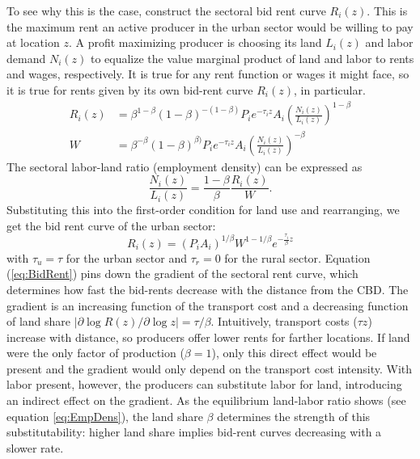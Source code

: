 \documentclass[12pt]{article}
\begin{document}
To see why this is the case, construct the sectoral bid rent curve $R_i(z)$. This is the maximum rent an active producer in the urban sector would be willing to pay at location $z$. %
A profit maximizing producer is choosing its land $L_i(z)$ and labor demand $N_i(z)$ to equalize the value marginal product of land and labor to rents and wages, respectively. It is true for any rent function or wages it might face, so it is true for rents given by its own bid-rent curve $R_i(z)$, in particular.
\begin{align}
R_i(z) &=\beta^{1-\beta}(1-\beta)^{-(1-\beta)} P_ie^{-\tau_i z}A_i \left(\frac{N_i(z)}{L_i(z)}\right)^{1-\beta}\\
W &=\beta^{-\beta}(1-\beta)^{\beta)} P_ie^{-\tau_i z}A_i \left(\frac{N_i(z)}{L_i(z)}\right)^{-\beta}
\end{align}
The sectoral labor-land ratio (employment density) can be expressed as
\begin{equation}
\label{eq:EmpDens}
\frac{N_i(z)}{L_i(z)} = \frac{1-\beta}{\beta}\frac{R_i(z)}{W}.
\end{equation}
Substituting this into the first-order condition for land use and rearranging, we get the bid rent curve of the urban sector:
\begin{equation}
\label{eq:BidRent}
R_i(z) =(P_iA_i)^{1/\beta} W^{1-1/\beta} e^{-\frac{\tau_i}{\beta} z}
\end{equation}
with $\tau_u=\tau$ for the urban sector and $\tau_r=0$ for the rural sector. Equation (\ref{eq:BidRent}) pins down the gradient of the sectoral rent curve, which determines how fast the bid-rents decrease with the distance from the CBD. The gradient is an increasing function of the transport cost and a decreasing function of land share $|\partial\log R(z)/\partial \log z|=\tau/\beta$. Intuitively, transport costs ($\tau z$) increase with distance, so producers offer lower rents for farther locations. If land were the only factor of production ($\beta=1$), only this direct effect would be present and the gradient would only depend on the transport cost intensity. With labor present, however, the producers can substitute labor for land, introducing an indirect effect on the gradient. As the equilibrium land-labor ratio shows (see equation \ref{eq:EmpDens}), the land share $\beta$ determines the strength of this substitutability: higher land share implies bid-rent curves decreasing with a slower rate.
\end{document}
